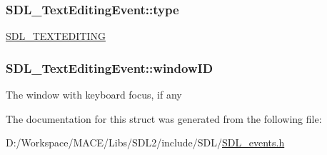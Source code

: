 \subsubsection[{\texorpdfstring{type}{type}}]{ S\+D\+L\+\_\+\+Text\+Editing\+Event\+::type}\hypertarget{struct_s_d_l___text_editing_event_a198e6df194a3bf12cf5f82553e84c7cb}{}\label{struct_s_d_l___text_editing_event_a198e6df194a3bf12cf5f82553e84c7cb}
\hyperlink{_s_d_l__events_8h_a3b589e89be6b35c02e0dd34a55f3fccaa1b80c465df69c0b6d06f026ce7a230e3}{S\+D\+L\+\_\+\+T\+E\+X\+T\+E\+D\+I\+T\+I\+NG} 
\subsubsection[{\texorpdfstring{window\+ID}{windowID}}]{ S\+D\+L\+\_\+\+Text\+Editing\+Event\+::window\+ID}\hypertarget{struct_s_d_l___text_editing_event_a23b3e414cf7a7ccc547b7595ca930049}{}\label{struct_s_d_l___text_editing_event_a23b3e414cf7a7ccc547b7595ca930049}
The window with keyboard focus, if any 

The documentation for this struct was generated from the following file\+:\begin{DoxyCompactItemize}
\item 
D\+:/\+Workspace/\+M\+A\+C\+E/\+Libs/\+S\+D\+L2/include/\+S\+D\+L/\hyperlink{_s_d_l__events_8h}{S\+D\+L\+\_\+events.\+h}\end{DoxyCompactItemize}
